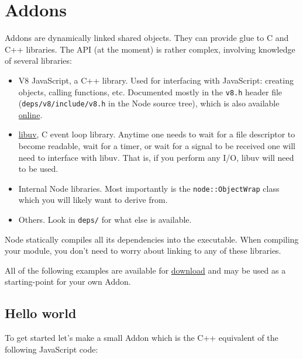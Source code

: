 \section{Addons}

Addons are dynamically linked shared objects. They can provide glue to C
and C++ libraries. The API (at the moment) is rather complex, involving
knowledge of several libraries:

\begin{itemize}
\item
  V8 JavaScript, a C++ library. Used for interfacing with JavaScript:
  creating objects, calling functions, etc. Documented mostly in the
  \texttt{v8.h} header file (\texttt{deps/v8/include/v8.h} in the Node
  source tree), which is also available
  \href{http://izs.me/v8-docs/main.html}{online}.
\item
  \href{https://github.com/joyent/libuv}{libuv}, C event loop library.
  Anytime one needs to wait for a file descriptor to become readable,
  wait for a timer, or wait for a signal to be received one will need to
  interface with libuv. That is, if you perform any I/O, libuv will need
  to be used.
\item
  Internal Node libraries. Most importantly is the
  \texttt{node::ObjectWrap} class which you will likely want to derive
  from.
\item
  Others. Look in \texttt{deps/} for what else is available.
\end{itemize}

Node statically compiles all its dependencies into the executable. When
compiling your module, you don't need to worry about linking to any of
these libraries.

All of the following examples are available for
\href{https://github.com/rvagg/node-addon-examples}{download} and may be
used as a starting-point for your own Addon.

\subsection{Hello world}

To get started let's make a small Addon which is the C++ equivalent of
the following JavaScript code:

\begin{Shaded}
\begin{Highlighting}[]
 \NormalTok{= }\NormalTok{() \{ } \NormalTok{; \};}
\end{Highlighting}
\end{Shaded}

